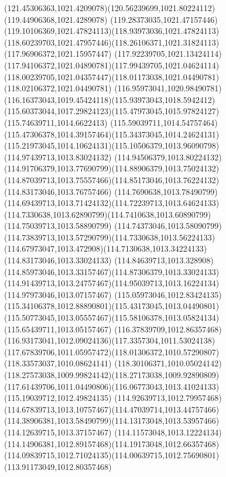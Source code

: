 {    \curveto(121.45306363,1021.4209078)(120.56239699,1021.80224112)(119.44906368,1021.4289078)
    \curveto(119.28373035,1021.47157446)(119.10106369,1021.47824113)(118.93973036,1021.47824113)
    \curveto(118.60239703,1021.47957446)(118.26106371,1021.31824113)(117.96906372,1021.15957447)
    \curveto(117.92239705,1021.13424114)(117.94106372,1021.04890781)(117.99439705,1021.04624114)
    \curveto(118.00239705,1021.04357447)(118.01173038,1021.04490781)(118.02106372,1021.04490781)
    \curveto(116.95973041,1020.98490781)(116.16373043,1019.45424118)(115.93973043,1018.5942412)
    \curveto(115.60373044,1017.29824123)(115.47973045,1015.97824127)(115.74639711,1014.6622413)
    \curveto(115.59039711,1014.54757464)(115.47306378,1014.39157464)(115.34373045,1014.24624131)
    \curveto(115.21973045,1014.10624131)(115.10506379,1013.96090798)(114.97439713,1013.83024132)
    \curveto(114.94506379,1013.80224132)(114.91706379,1013.77690799)(114.88906379,1013.75024132)
    \curveto(114.87039713,1013.75557466)(114.85173046,1013.76224132)(114.83173046,1013.76757466)
    \curveto(114.7690638,1013.78490799)(114.69439713,1013.71424132)(114.72239713,1013.64624133)
    \curveto(114.7330638,1013.62890799)(114.7410638,1013.60890799)(114.75039713,1013.58890799)
    \curveto(114.74373046,1013.58090799)(114.73839713,1013.57290799)(114.7330638,1013.56224133)
    \curveto(114.67973047,1013.472908)(114.7130638,1013.34224133)(114.83173046,1013.33024133)
    \curveto(114.84639713,1013.328908)(114.85973046,1013.33157467)(114.87306379,1013.33024133)
    \curveto(114.91439713,1013.24757467)(114.95039713,1013.16224134)(114.97973046,1013.07157467)
    \curveto(115.05973046,1012.83424135)(115.34106378,1012.88890801)(115.43173045,1013.04490801)
    \curveto(115.50773045,1013.05557467)(115.58106378,1013.05824134)(115.65439711,1013.05157467)
    \curveto(116.37839709,1012.86357468)(116.93173041,1012.09024136)(117.3357304,1011.53024138)
    \curveto(117.67839706,1011.05957472)(118.01306372,1010.57290807)(118.33573037,1010.08624141)
    \curveto(118.30106371,1010.05024142)(118.27573038,1009.99824142)(118.27173038,1009.92890809)
    \curveto(117.61439706,1011.04490806)(116.06773043,1013.41024133)(115.19039712,1012.49824135)
    \curveto(114.92639713,1012.79957468)(114.67839713,1013.10757467)(114.47039714,1013.44757466)
    \curveto(114.38906381,1013.58490799)(114.13173048,1013.53957466)(114.12639715,1013.37157467)
    \curveto(114.11573048,1013.12224134)(114.14906381,1012.89157468)(114.19173048,1012.66357468)
    \curveto(114.09839715,1012.71024135)(114.00639715,1012.75690801)(113.91173049,1012.80357468)
}

